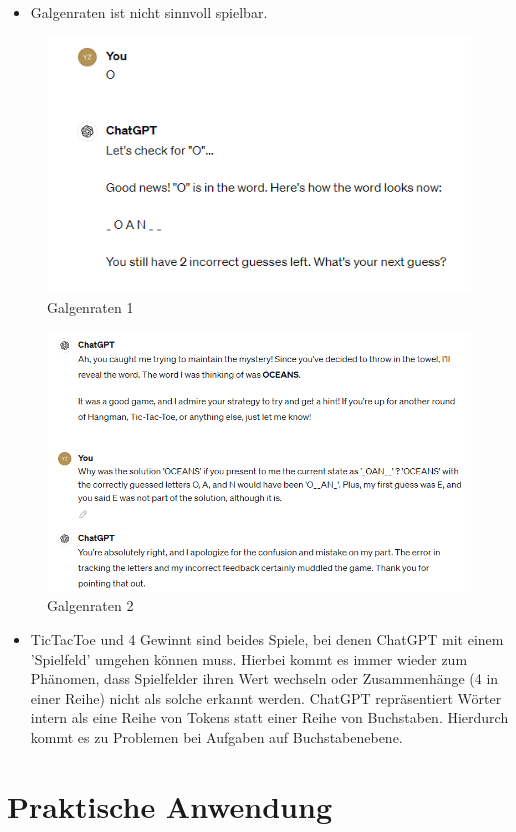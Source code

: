 \documentclass[12pt,ngerman]{AssignmentClass}
\begin{document}
        \begin{itemize}
            \item Galgenraten ist nicht sinnvoll spielbar.
        \end{itemize}
        
        \begin{figure}
            \centering
            \includegraphics[width=0.5\linewidth]{2024-04-22 09_44_49-Play TicTacToe with Me.png}
            \caption{Galgenraten 1}
            \label{fig:hangman_1}
        \end{figure}
        \begin{figure}
            \centering
            \includegraphics[width=0.5\linewidth]{2024-04-22 09_45_28-Play TicTacToe with Me.png}
            \caption{Galgenraten 2}
            \label{fig:hangman_2}
        \end{figure}

        \begin{itemize}
            \item TicTacToe und 4 Gewinnt sind beides Spiele, bei denen ChatGPT mit einem 'Spielfeld' umgehen können muss. Hierbei kommt es immer wieder zum Phänomen, dass Spielfelder ihren Wert wechseln oder Zusammenhänge (4 in einer Reihe) nicht als solche erkannt werden. ChatGPT repräsentiert Wörter intern als eine Reihe von Tokens statt einer Reihe von Buchstaben. Hierdurch kommt es zu Problemen bei Aufgaben auf Buchstabenebene.
        \end{itemize}
    
    
    \section{Praktische Anwendung}
    
\end{document}

